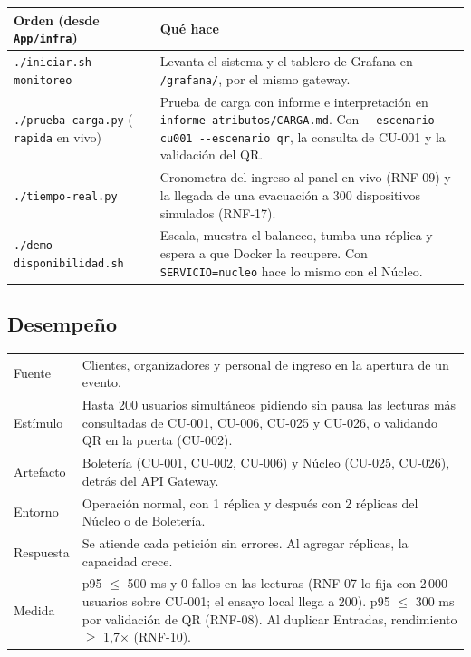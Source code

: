 \begin{center}
\begin{tabular}{|>{\raggedright\arraybackslash}p{6.2cm}|>{\raggedright\arraybackslash}p{7.4cm}|}
\hline
\textbf{Orden (desde \texttt{App/infra})} & \textbf{Qué hace}\\
\hline
\texttt{./iniciar.sh -{}-monitoreo} & Levanta el sistema y el tablero de Grafana en
\texttt{/grafana/}, por el mismo gateway.\\
\hline
\texttt{./prueba-carga.py} (\texttt{-{}-rapida} en vivo) & Prueba de carga con informe e
interpretación en \texttt{informe-atributos/CARGA.md}. Con \texttt{-{}-escenario cu001
-{}-escenario qr}, la consulta de CU-001 y la validación del QR.\\
\hline
\texttt{./tiempo-real.py} & Cronometra del ingreso al panel en vivo (RNF-09) y la llegada de una
evacuación a 300 dispositivos simulados (RNF-17).\\
\hline
\texttt{./demo-disponibilidad.sh} & Escala, muestra el balanceo, tumba una réplica y espera a que
Docker la recupere. Con \texttt{SERVICIO=nucleo} hace lo mismo con el Núcleo.\\
\hline
\end{tabular}
\end{center}

\subsection{Desempeño}
\label{sec:desempeno-vigente}

\begin{center}
\begin{tabular}{|>{\raggedright\arraybackslash}p{3.2cm}|>{\raggedright\arraybackslash}p{10.4cm}|}
\hline
\multicolumn{2}{|l|}{\textbf{Escenario de calidad · Desempeño (RNF-07, RNF-08, RNF-10)}}\\
\hline
Fuente & Clientes, organizadores y personal de ingreso en la apertura de un evento.\\
\hline
Estímulo & Hasta 200 usuarios simultáneos pidiendo sin pausa las lecturas más consultadas de
CU-001, CU-006, CU-025 y CU-026, o validando QR en la puerta (CU-002).\\
\hline
Artefacto & Boletería (CU-001, CU-002, CU-006) y Núcleo (CU-025, CU-026), detrás del API Gateway.\\
\hline
Entorno & Operación normal, con 1 réplica y después con 2 réplicas del Núcleo o de Boletería.\\
\hline
Respuesta & Se atiende cada petición sin errores. Al agregar réplicas, la capacidad crece.\\
\hline
Medida & p95 $\leq$ 500 ms y 0 fallos en las lecturas (RNF-07 lo fija con 2\,000 usuarios sobre
CU-001; el ensayo local llega a 200). p95 $\leq$ 300 ms por validación de QR (RNF-08). Al
duplicar Entradas, rendimiento $\geq$ 1,7$\times$ (RNF-10).\\
\hline
\end{tabular}
\end{center}


